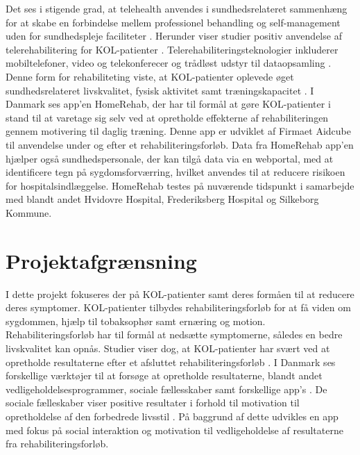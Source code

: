 Det ses i stigende grad, at telehealth anvendes i sundhedsrelateret sammenhæng for at skabe en forbindelse mellem professionel behandling og self-management uden for sundhedspleje faciliteter \cite{Williams2014,WHOtelehealth2017}. Herunder viser studier positiv anvendelse af telerehabilitering for KOL-patienter \cite{Zanaboni2017}. Telerehabiliteringsteknologier inkluderer mobiltelefoner, video og telekonferecer og trådløst udstyr til dataopsamling \cite{WHOrehab2017,Zanaboni2017}. Denne form for rehabiliteting viste, at KOL-patienter oplevede øget sundhedsrelateret livskvalitet, fysisk aktivitet samt træningskapacitet \cite{Zanaboni2017}. 
I Danmark ses app'en HomeRehab, der har til formål at gøre KOL-patienter i stand til at varetage sig selv ved at opretholde effekterne af rehabiliteringen gennem motivering til daglig træning. Denne app er udviklet af Firmaet Aidcube til anvendelse under og efter et rehabiliteringsforløb. Data fra HomeRehab app'en hjælper også sundhedspersonale, der kan tilgå data via en webportal, med at identificere tegn på sygdomsforværring, hvilket anvendes til at reducere risikoen for hospitalsindlæggelse. HomeRehab testes på nuværende tidspunkt i samarbejde med blandt andet Hvidovre Hospital, Frederiksberg Hospital og Silkeborg Kommune.\cite{HealthcareDenmark2017} 

\section{Projektafgrænsning}
I dette projekt fokuseres der på KOL-patienter samt deres formåen til at reducere deres symptomer. KOL-patienter tilbydes rehabiliteringsforløb for at få viden om sygdommen, hjælp til tobaksophør samt ernæring og motion. Rehabiliteringsforløb har til formål at nedsætte symptomerne, således en bedre livskvalitet kan opnås.\cite{McCarthy2015,Lungeforeningen2016,Habraken2011,Sundhedsstyrelsen2015} Studier viser dog, at KOL-patienter har svært ved at opretholde resultaterne efter et afsluttet rehabiliteringsforløb \cite{Egan2012,Beachamp2013,Zanaboni2017,Ringbaek2008}. I Danmark ses forskellige værktøjer til at forsøge at opretholde resultaterne, blandt andet vedligeholdelsesprogrammer, sociale fællesskaber samt forskellige app's \cite{Sundhedsstyrelsen2015,HealthcareDenmark2017}. De sociale fælleskaber viser positive resultater i forhold til motivation til opretholdelse af den forbedrede livsstil \cite{dsam2016}.
På baggrund af dette udvikles en app med fokus på social interaktion og motivation til vedligeholdelse af resultaterne fra rehabiliteringsforløb. 

